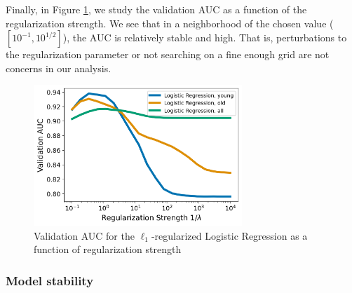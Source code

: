 \documentclass[11pt, letterpaper]{amsart}
\let\Oldsubsubsection\subsubsection
\renewcommand{\subsubsection}{\FloatBarrier\Oldsubsubsection}
\begin{document}
Finally, in Figure \ref{fig:lr_lambda_auc}, we study the validation AUC as a function of the regularization strength. We see that in a neighborhood of the chosen value ($[10^{-1}, 10^{1/2}]$), the AUC is relatively stable and high. That is, perturbations to the regularization parameter or not searching on a fine enough grid are not concerns in our analysis. 
\begin{figure}
	\centering
	\includegraphics[width=0.7\textwidth]{lr_auc_lambda.png}
	\caption{Validation AUC for the $\ell_1$-regularized Logistic Regression as a function of regularization strength}\label{fig:lr_lambda_auc}
\end{figure}

\subsubsection{Model stability}
\end{document}
